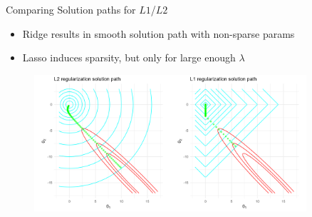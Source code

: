 \documentclass[11pt,compress,t,notes=noshow, xcolor=table]{beamer}
\begin{document}
\begin{vbframe}{Comparing Solution paths for $L1$/$L2$}
\begin{itemize}
    \item Ridge results in  smooth solution path with non-sparse params
    \item Lasso induces sparsity, but only for large enough $\lambda$
\end{itemize}
 \lz
\begin{figure}
\includegraphics[width=0.9\textwidth]{figure/solution_paths_01.png}\\
\end{figure}

\end{vbframe}

 

\end{document}

